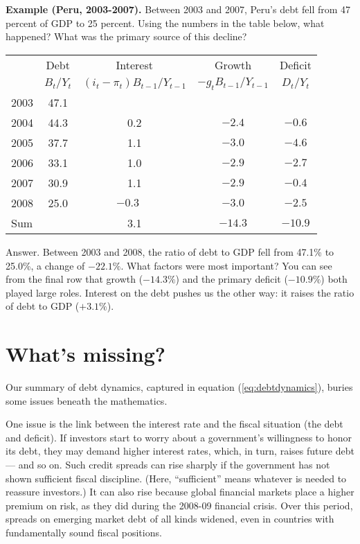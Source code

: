 \textbf{Example (Peru, 2003-2007).}
Between 2003 and 2007,
Peru's debt fell from 47 percent of GDP to 25 percent.
Using the numbers in the table below, what happened?
What was the primary source of this decline?

\begin{center}
\begin{tabular*}{\textwidth}{lcccc}
\toprule
        & Debt   & Interest &  Growth
            & \phantom{x}Deficit\phantom{x} \\
        &  $B_{t}/Y_{t}$ &  $(i_t-\pi_t)B_{t-1}/Y_{t-1}$  &  $-g_t B_{t-1}/Y_{t-1}$
                & $D_t/Y_t$ \\
\midrule
2003\phantom{xxxx}
            & 47.1 &  \\
2004        & 44.3 & 0.2 & $-2.4$ & $-0.6$  \\
2005        & 37.7 & 1.1 & $-3.0$ & $-4.6$  \\
2006        & 33.1 & 1.0 & $-2.9$ & $-2.7$  \\
2007        & 30.9 & 1.1 & $-2.9$ & $-0.4$  \\
2008        & 25.0 & $-0.3\phantom{-}$ & $-3.0$ & $-2.5$ \\
\midrule
Sum         &      & 3.1 & $-14.3$ & $-10.9$ \\
\bottomrule
\end{tabular*}
\end{center}

Answer.  
Between 2003 and 2008, 
the ratio of debt to GDP fell from 47.1\% to 25.0\%, 
a change of $-22.1\%$. 
What factors were most important? 
You can see from the final row that
growth ($-14.3\%$) and the primary deficit ($-10.9\%$) both played large roles.
Interest on the debt pushes us the other way: it raises 
the ratio of debt to GDP ($+3.1\%$).  


\section{What's missing?}

Our summary of debt dynamics,
captured in equation (\ref{eq:debtdynamics}), buries some issues beneath the mathematics.

One issue is the link between the interest rate
and the fiscal situation (the debt and deficit).
If investors start to worry about a government's
willingness to honor its debt,
they may demand higher interest rates,
which, in turn, raises future debt --- and so on.
Such credit spreads can rise sharply
if the government has not shown sufficient
fiscal discipline.
(Here, ``sufficient'' means whatever is needed to reassure
investors.)
It can also rise because global financial markets
place a higher premium on risk,
as they did during the 2008-09 financial crisis.
Over this period, spreads on emerging market debt of all kinds
widened, even in countries with fundamentally sound
fiscal positions.

